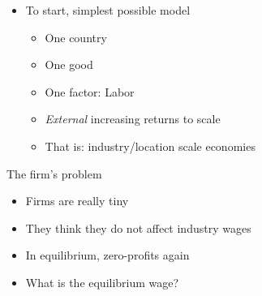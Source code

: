 \documentclass[ignorenonframetext,]{beamer}
\begin{document}
\begin{frame}

    \begin{itemize}
        \item To start, simplest possible model
        \begin{itemize}
            \item One country
            \item One good
            \item One factor: Labor
            \item \emph{External} increasing returns to scale
            \item That is: industry/location scale economies
        \end{itemize}
    \end{itemize}

\end{frame}

\begin{frame}{The firm's problem}

    \begin{itemize}
        \item Firms are really tiny
        \item They think they do not affect industry wages
        \item In equilibrium, zero-profits again 
        \item What is the equilibrium wage?
    \end{itemize}
    
\end{frame}
\end{document}
